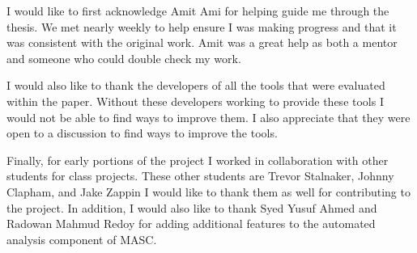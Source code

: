 \begin{large}
\begin{flushleft}
\noindent I would like to first acknowledge Amit Ami for helping guide me through the thesis. We met nearly weekly to help ensure I was making progress and that it was consistent with the original work. Amit was a great help as both a mentor and someone who could double check my work. \\
\end{flushleft}

\begin{flushleft}
\noindent I would also like to thank the developers of all the tools that were evaluated within the paper. Without these developers working to provide these tools I would not be able to find ways to improve them. I also appreciate that they were open to a discussion to find ways to improve the tools.\\
\end{flushleft}

\begin{flushleft}
\noindent Finally, for early portions of the project I worked in collaboration with other students for class projects. These other students are Trevor Stalnaker, Johnny Clapham, and Jake Zappin I would like to thank them as well for contributing to the project. In addition, I would also like to thank Syed Yusuf Ahmed and Radowan Mahmud Redoy for adding additional features to the automated analysis component of MASC.\\
\end{flushleft}


\end{large}